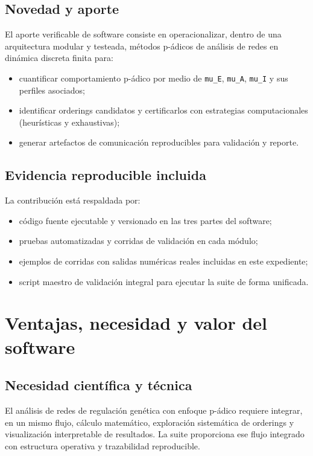 \documentclass[11pt]{article}
\begin{document}
\subsection*{Novedad y aporte}
El aporte verificable de software consiste en operacionalizar, dentro de una
arquitectura modular y testeada, métodos p-ádicos de análisis de redes en
dinámica discreta finita para:
\begin{itemize}
  \item cuantificar comportamiento p-ádico por medio de \texttt{mu\_E},
  \texttt{mu\_A}, \texttt{mu\_I} y sus perfiles asociados;
  \item identificar orderings candidatos y certificarlos con estrategias
  computacionales (heurísticas y exhaustivas);
  \item generar artefactos de comunicación reproducibles para validación y
  reporte.
\end{itemize}

\subsection*{Evidencia reproducible incluida}
La contribución está respaldada por:
\begin{itemize}
  \item código fuente ejecutable y versionado en las tres partes del software;
  \item pruebas automatizadas y corridas de validación en cada módulo;
  \item ejemplos de corridas con salidas numéricas reales incluidas en este
  expediente;
  \item script maestro de validación integral para ejecutar la suite de forma
  unificada.
\end{itemize}

\section{Ventajas, necesidad y valor del software}
\subsection*{Necesidad científica y técnica}
El análisis de redes de regulación genética con enfoque p-ádico requiere
integrar, en un mismo flujo, cálculo matemático, exploración sistemática de
orderings y visualización interpretable de resultados. La suite proporciona
ese flujo integrado con estructura operativa y trazabilidad reproducible.
\end{document}
